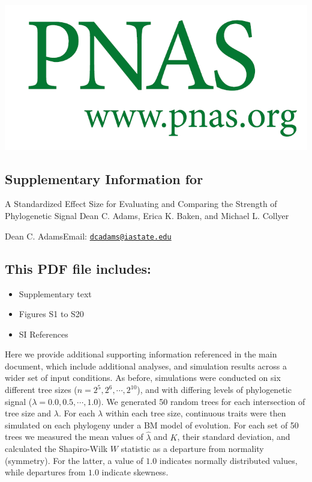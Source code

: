 \documentclass[
]{article}
\author{}
\date{\vspace{-2.5em}}
\providecommand{\tightlist}{%
  \setlength{\itemsep}{0pt}\setlength{\parskip}{0pt}}
\begin{document}
\includegraphics[width=0.95\linewidth]{SI-Title} \hfill\break
\hfill\break

\hypertarget{supplementary-information-for}{%
\subsection{Supplementary Information
for}\label{supplementary-information-for}}

\hfill\break

A Standardized Effect Size for Evaluating and Comparing the Strength of
Phylogenetic Signal \hfill\break \hfill\break Dean C. Adams, Erica K.
Baken, and Michael L. Collyer \hfill\break

\hfill\break

Dean C. Adams\hfill\break Email:
\href{mailto:dcadams@iastate.edu}{\nolinkurl{dcadams@iastate.edu}}\hfill\break

\hypertarget{this-pdf-file-includes}{%
\subsection{This PDF file includes:}\label{this-pdf-file-includes}}

\hfill\break

\begin{itemize}
\tightlist
\item
  Supplementary text
\item
  Figures S1 to S20
\item
  SI References
\end{itemize}

\newpage

Here we provide additional supporting information referenced in the main
document, which include additional analyses, and simulation results
across a wider set of input conditions. As before, simulations were
conducted on six different tree sizes (\(n=2^5, 2^6, \cdots, 2^{10}\)),
and with differing levels of phylogenetic signal
(\(\lambda=0.0, 0.5, \cdots, 1.0\)). We generated 50 random trees for
each intersection of tree size and \(\lambda\). For each \(\lambda\)
within each tree size, continuous traits were then simulated on each
phylogeny under a BM model of evolution. For each set of 50 trees we
measured the mean values of \(\hat{\lambda}\) and \(K\), their standard
deviation, and calculated the Shapiro-Wilk \(W\) statistic as a
departure from normality (symmetry). For the latter, a value of \(1.0\)
indicates normally distributed values, while departures from \(1.0\)
indicate skewness.
\end{document}
